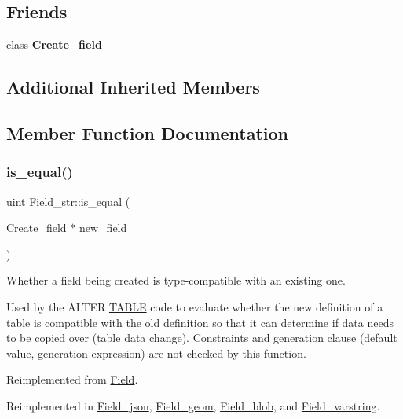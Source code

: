 \subsection*{Friends}
\begin{DoxyCompactItemize}
\item 
\mbox{\label{classField__str_a265d534d76a1476aa7d523bce5d390dc}} 
class {\bfseries Create\+\_\+field}
\end{DoxyCompactItemize}
\subsection*{Additional Inherited Members}


\subsection{Member Function Documentation}
\mbox{\label{classField__str_a281f4c166dbbfd070c6038c8b6f1595a}} 
\subsubsection{\texorpdfstring{is\+\_\+equal()}{is\_equal()}}
{\footnotesize\ttfamily uint Field\+\_\+str\+::is\+\_\+equal (\begin{DoxyParamCaption}\item[{\mbox{\hyperlink{classCreate__field}{Create\+\_\+field}} $\ast$}]{new\+\_\+field }\end{DoxyParamCaption})\hspace{0.3cm}{\ttfamily [virtual]}}

Whether a field being created is type-\/compatible with an existing one.

Used by the A\+L\+T\+ER \mbox{\hyperlink{structTABLE}{T\+A\+B\+LE}} code to evaluate whether the new definition of a table is compatible with the old definition so that it can determine if data needs to be copied over (table data change). Constraints and generation clause (default value, generation expression) are not checked by this function. 

Reimplemented from \mbox{\hyperlink{classField_a8c99e9c66c1d578a339ae87d128843b7}{Field}}.



Reimplemented in \mbox{\hyperlink{classField__json_a12d3ba38a6c987f627dce55780947578}{Field\+\_\+json}}, \mbox{\hyperlink{classField__geom_a20953b29b4a85e8d77f16593313fd381}{Field\+\_\+geom}}, \mbox{\hyperlink{classField__blob_aad2a7c5fe21d9c7cfd20aeea52c58ed5}{Field\+\_\+blob}}, and \mbox{\hyperlink{classField__varstring_aa0bfc217f9c90b2cc741cdec8b97dd5c}{Field\+\_\+varstring}}.

